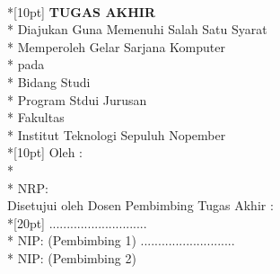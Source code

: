 \newpage
    \centering
        \textbf{\MakeUppercase{\judul}} \\*[10pt]
        \textbf{\large{TUGAS AKHIR}} \\*
        Diajukan Guna Memenuhi Salah Satu Syarat \\*
        Memperoleh Gelar Sarjana Komputer \\*
        pada \\*
        Bidang Studi \bidangStudi \\*
        Program Stdui \prodi Jurusan \jurusan \\*
        Fakultas \fakultas \\*
        Institut Teknologi Sepuluh Nopember \\*[10pt]
        Oleh : \\*
        \textbf{\penulis} \\*
        NRP: \nrp \\

    \justify
        Disetujui oleh Dosen Pembimbing Tugas Akhir :\\*[20pt]
        \pembimbingSatu \hfil \hfill ............................ \\*
        NIP: \nipPembimbingSatu \hfill \hfill \centering (Pembimbing 1) \justify
        \pembimbingDua  \hfill \hfill ........................... \\*
        NIP: \nipPembimbingDua \hfill \hfill \centering (Pembimbing 2) \justify
    \cleardoublepage
